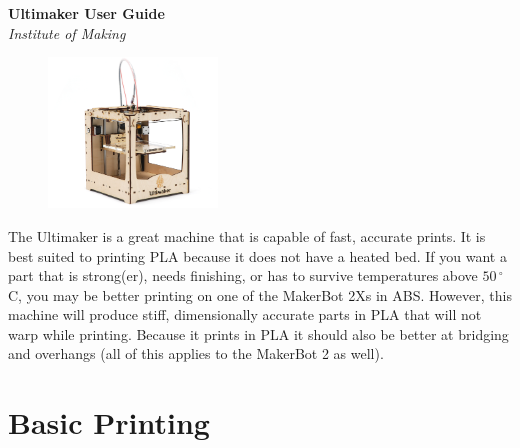 \documentclass[a4paper,12pt]{article}
\begin{document}
\thispagestyle{empty}

\begin{center}
    \hspace*{-2.5cm}\Huge\textbf{Ultimaker User Guide}\\
    \hspace*{-7.cm}\Large\textit{Institute of Making}
\end{center}



\vspace*{0.5cm}

\begin{figure}
\begin{center}
{\vspace*{-1.5cm} \includegraphics[width=4.5cm]{ultimaker}}
\end{center}
\end{figure}

\noindent The Ultimaker is a great machine that is capable of fast, accurate prints. It is best suited to printing PLA because it does not have a heated bed. If you want a part that is strong(er), needs finishing, or has to
survive temperatures above $50 \,^{\circ}$C, you may be better printing on one of the MakerBot 2Xs in ABS. However, this machine will produce stiff, dimensionally accurate 
parts in PLA that will not warp while printing. Because it prints in PLA it should also be better at bridging and overhangs (all of this applies to the MakerBot 2 as well).

\section*{Basic Printing}
\end{document}
